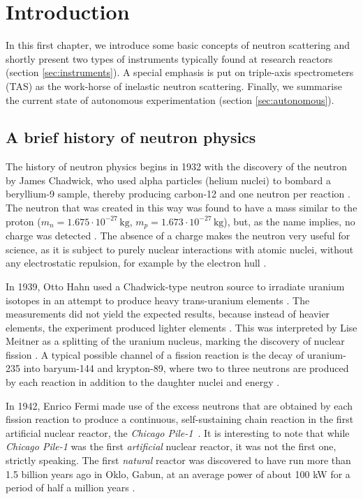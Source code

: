 %
%

\chapter{Introduction}
\label{ch:intro}
In this first chapter, we introduce some basic concepts of neutron scattering and shortly present two types of
instruments typically found at research reactors (section \ref{sec:instruments}). A special emphasis is put
on triple-axis spectrometers (TAS) as the work-horse of inelastic neutron scattering. Finally, we summarise
the current state of autonomous experimentation (section \ref{sec:autonomous}).


\section{A brief history of neutron physics \label{sec:neutrons}}

The history of neutron physics begins in 1932 with the discovery of the neutron by James Chadwick, who used
alpha particles (helium nuclei) to bombard a beryllium-9 sample, thereby producing carbon-12 and one neutron
per reaction \cite[p. 1]{Jacrot2021}. The neutron that was created in this way was found to have a mass similar
to the proton ($m_n = 1.675\cdot10^{-27}\,\mathrm{kg}$, $m_p = 1.673\cdot10^{-27}\,\mathrm{kg}$), but, as the
name implies, no charge was detected \cite[p. 2]{Squires2012}. The absence of a charge makes the neutron very
useful for science, as it is subject to purely nuclear interactions with atomic nuclei, without any electrostatic
repulsion, for example by the electron hull \cite[p. 1]{Squires2012}.

In 1939, Otto Hahn used a Chadwick-type neutron source to irradiate uranium isotopes in an attempt to produce
heavy trans-uranium elements \cite{wiki_fission}. The measurements did not yield the expected results, because
instead of heavier elements, the experiment produced lighter elements \cite{wiki_fission}.
This was interpreted by Lise Meitner as a splitting of the uranium nucleus, marking the discovery of
nuclear fission \cite{wiki_fission}.
A typical possible channel of a fission reaction is the decay of uranium-235 into baryum-144 and krypton-89,
where two to three neutrons are produced by each reaction in addition to the daughter nuclei and energy \cite{wiki_fission}.

In 1942, Enrico Fermi made use of the excess neutrons that are obtained by each fission reaction to produce a
continuous, self-sustaining chain reaction in the first artificial nuclear reactor, the
\textit{Chicago Pile-1}~\cite[p.1]{Jacrot2021}.
It is interesting to note that while \textit{Chicago Pile-1} was the first \textit{artificial} nuclear reactor,
it was not the first one, strictly speaking. The first \textit{natural} reactor was discovered to have run more
than 1.5 billion years ago in Oklo, Gabun, at an average power of about 100 kW for a period of half a million
years \cite{wiki_oklo}.

